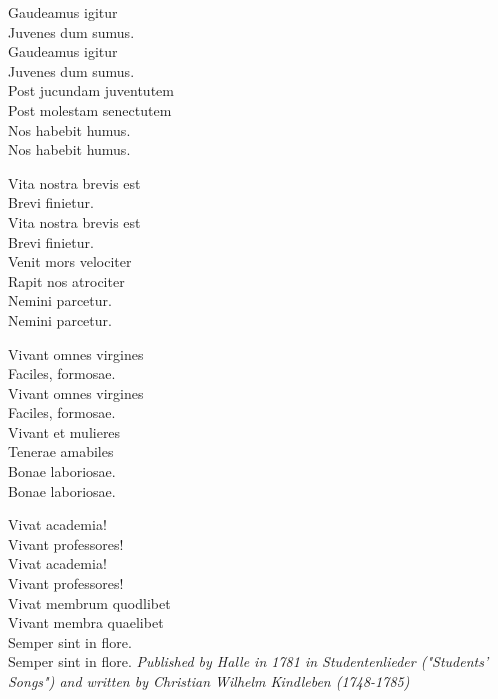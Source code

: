 \vspace{10pt}
\par
Gaudeamus igitur\\
Juvenes dum sumus.\\
Gaudeamus igitur\\
Juvenes dum sumus.\\
Post jucundam juventutem\\
Post molestam senectutem\\
Nos habebit humus.\\
Nos habebit humus.\par
\vspace{10pt}
Vita nostra brevis est\\
Brevi finietur.\\
Vita nostra brevis est\\
Brevi finietur.\\
Venit mors velociter\\
Rapit nos atrociter\\
Nemini parcetur.\\
Nemini parcetur.\par
\vspace{10pt}
Vivant omnes virgines\\
Faciles, formosae.\\
Vivant omnes virgines\\
Faciles, formosae.\\
Vivant et mulieres\\
Tenerae amabiles\\
Bonae laboriosae.\\
Bonae laboriosae.\par
\vspace{10pt}
Vivat academia!\\
Vivant professores!\\
Vivat academia!\\
Vivant professores!\\
Vivat membrum quodlibet\\
Vivant membra quaelibet\\
Semper sint in flore.\\
Semper sint in flore.
\vspace{10pt}
{\footnotesize\textit{Published by Halle in 1781 in Studentenlieder ("Students' Songs") and written by Christian Wilhelm Kindleben (1748-1785)}}
